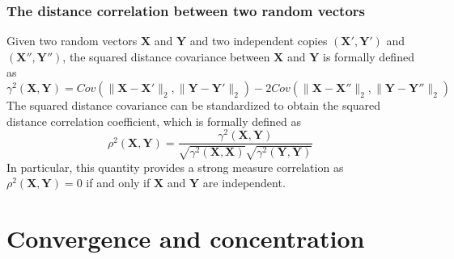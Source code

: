 \documentclass{report}
\begin{document}
\subsection{The distance correlation between two random vectors}
Given two random vectors $\displaystyle \mathbf{X}$ and $\displaystyle \mathbf{Y}$ and two independent copies $\displaystyle (\mathbf{X}', \mathbf{Y}')$ and $\displaystyle (\mathbf{X}'', \mathbf{Y}'')$, the squared distance covariance between $\displaystyle \mathbf{X}$ and $\displaystyle \mathbf{Y}$ is formally defined as
\[\gamma^2(\mathbf{X}, \mathbf{Y}) = Cov(\lVert \mathbf{X} - \mathbf{X}' \rVert_2, \lVert \mathbf{Y} - \mathbf{Y}' \rVert_2) - 2Cov(\lVert \mathbf{X} - \mathbf{X}'' \rVert_2, \lVert \mathbf{Y} - \mathbf{Y}'' \rVert_2)\]
The squared distance covariance can be standardized to obtain the squared distance correlation coefficient, which is formally defined as
\[\rho^2(\mathbf{X}, \mathbf{Y}) = \frac{\gamma^2(\mathbf{X}, \mathbf{Y})}{\sqrt{\gamma^2(\mathbf{X}, \mathbf{X})}\sqrt{\gamma^2(\mathbf{Y}, \mathbf{Y})}}\]
In particular, this quantity provides a strong measure correlation as $\displaystyle \rho^2(\mathbf{X}, \mathbf{Y}) = 0$ if and only if $\displaystyle \mathbf{X}$ and $\displaystyle \mathbf{Y}$ are independent.

\chapter{Convergence and concentration}
\end{document}
